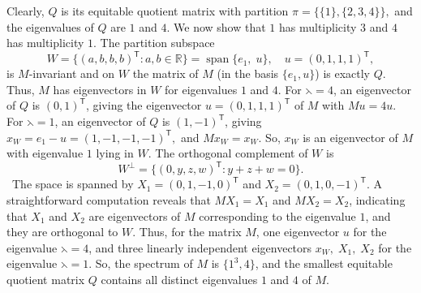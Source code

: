 \documentclass[12pt,twoside]{article}
\begin{document}
Clearly, $Q$ is its equitable quotient matrix with partition $\pi=\bigl\{\{1\},\{2,3,4\}\bigr\},$ and the eigenvalues of $Q$ are $1$ and $4$. We now show that $1$ has multiplicity $3$ and $4$ has multiplicity $1$. The partition subspace
	$$
	W = \{(a,b,b,b)^{\mathsf T}: a,b\in\mathbb{R}\}
	= \operatorname{span}\{e_1,\;u\},
	\quad
	u=(0,1,1,1)^{\mathsf T},
	$$
	is $M$-invariant and on $W$ the matrix of $M$ (in the basis $\{e_1,u\}$) is
	exactly $Q$. Thus, $M$ has eigenvectors in $W$ for eigenvalues $1$ and $4$. For $\leftthreetimes=4$, an eigenvector of $Q$ is $(0,1)^{\mathsf T}$, giving the
	eigenvector $u=(0,1,1,1)^{\mathsf T}$	of $M$ with $M u = 4u.$ For $\leftthreetimes=1$, an eigenvector of $Q$ is $(1,-1)^{\mathsf T}$, giving $x_W = e_1 - u = (1,-1,-1,-1)^{\mathsf T},$	and $M x_W = x_W.$ So,  $x_W$ is an eigenvector of $M$ with eigenvalue $1$ lying in $W$.  The orthogonal complement of \( W \) is $$ W^\perp = \{(0,y,z,w)^{\mathsf T} : y+z+w=0\}. $$ The space is spanned by \(X_1 = (0,1,-1,0)^{\mathsf T}\) and \(X_2 = (0,1,0,-1)^{\mathsf T}\). A straightforward computation reveals that \(M X_1 = X_1\) and \(M X_2 = X_2\), indicating that \(X_1\) and \(X_2\) are eigenvectors of \(M\) corresponding to the eigenvalue \(1\), and they are orthogonal to \(W\). 
	 Thus, for the matrix $M$,  one eigenvector $u$ for the eigenvalue  $\leftthreetimes=4$, and three linearly independent eigenvectors $x_W,\;X_1,\;X_2$ for the eigenvalue $\leftthreetimes=1$.  So, the spectrum of $M$ is  $\{1^3,4\}$, and the smallest equitable quotient matrix $Q$  contains all distinct eigenvalues $1$ and $4$ of $M$.
\end{document}

